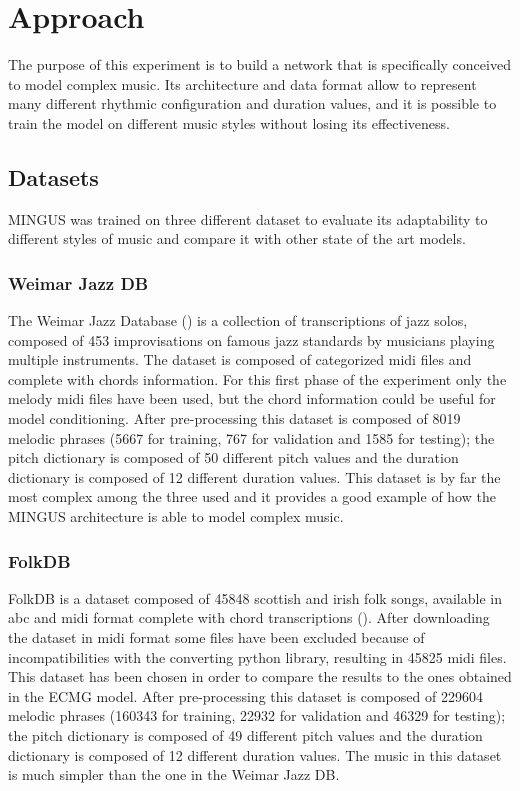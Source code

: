 \documentclass{article}
\begin{document}
\newpage
\section{Approach} \label{sec:approach}
The purpose of this experiment is to build a network that is specifically conceived to model complex music. Its architecture and data format allow to represent many different rhythmic configuration and duration values, and it is possible to train the model on different music styles without losing its effectiveness. 

\subsection{Datasets}\label{subsec:datasets}
MINGUS was trained on three different dataset to evaluate its adaptability to different styles of music and compare it with other state of the art models.

\subsubsection{Weimar Jazz DB}
The Weimar Jazz Database (\cite{Pfleiderer:2017:BOOK}) is a collection of transcriptions of jazz solos, composed of 453 improvisations on famous jazz standards by musicians playing multiple instruments. The dataset is composed of categorized midi files and complete with chords information. For this first phase of the experiment only the melody midi files have been used, but the chord information could be useful for model conditioning. After pre-processing this dataset is composed of 8019 melodic phrases (5667 for training, 767 for validation and 1585 for testing); the pitch dictionary is composed of 50 different pitch values and the duration dictionary is composed of 12 different duration values.
This dataset is by far the most complex among the three used and it provides a good example of how the MINGUS architecture is able to model complex music.

\subsubsection{FolkDB}
FolkDB is a dataset composed of 45848 scottish and irish folk songs, available in abc and midi format complete with chord transcriptions (\cite{folkDB}). After downloading the dataset in midi format some files have been excluded because of incompatibilities with the converting python library, resulting in 45825 midi files. 
This dataset has been chosen in order to compare the results to the ones obtained in the ECMG model. After pre-processing this dataset is composed of 229604 melodic phrases (160343 for training, 22932 for validation and 46329 for testing); the pitch dictionary is composed of 49 different pitch values and the duration dictionary is composed of 12 different duration values.
The music in this dataset is much simpler than the one in the Weimar Jazz DB.
\end{document}
